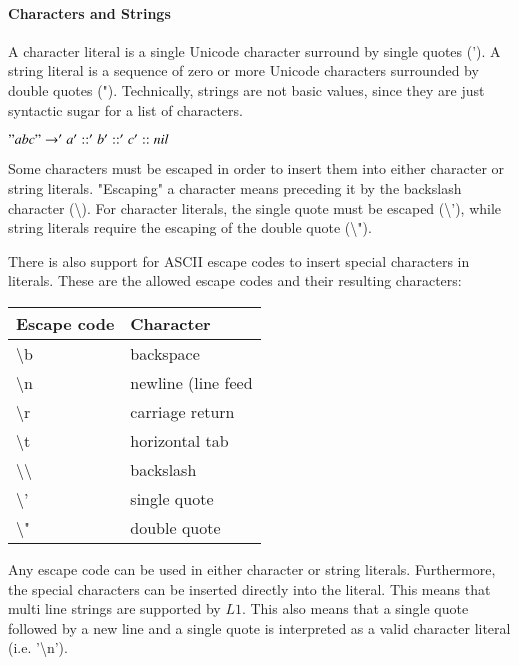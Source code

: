 \documentclass{article}
\begin{document}
\paragraph{Characters and Strings}
A character literal is a single Unicode character surround by single quotes (').
A string literal is a sequence of zero or more Unicode characters surrounded by double quotes (").
Technically, strings are not basic values, since they are just syntactic sugar for a list of characters.

$"abc" \rightarrow 'a' :: 'b' :: 'c' :: nil$

\bigskip

Some characters must be escaped in order to insert them into either character or string literals.
"Escaping" a character means preceding it by the backslash character (\textbackslash).
For character literals, the single quote must be escaped (\textbackslash'), while string literals require the escaping of the double quote (\textbackslash").

There is also support for ASCII escape codes to insert special characters in literals.
These are the allowed escape codes and their resulting characters:

\medskip

\begin{tabular}{|l|l|}
  \hline
  \textbf{Escape code} & \textbf{Character}\\
  \hline
  \textbackslash b & backspace\\
  \hline
  \textbackslash n & newline (line feed\\
  \hline
  \textbackslash r & carriage return\\
  \hline
  \textbackslash t & horizontal tab\\
  \hline
  \textbackslash \textbackslash & backslash\\
  \hline
  \textbackslash '  & single quote\\
  \hline
  \textbackslash "  & double quote\\
  \hline
\end{tabular}

\bigskip

Any escape code can be used in either character or string literals.
Furthermore, the special characters can be inserted directly into the literal.
This means that multi line strings are supported by $L1$.
This also means that a single quote followed by a new line and a single quote is interpreted as a valid character literal (i.e. '\textbackslash n').
\end{document}
